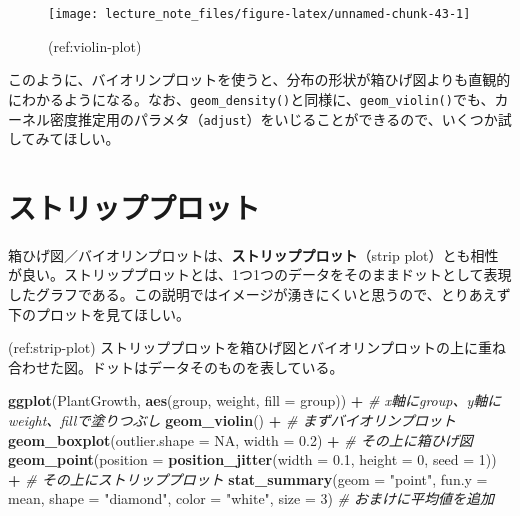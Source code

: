 \documentclass[]{book}
\newenvironment{Shaded}{\begin{snugshade}}{\end{snugshade}}
\newcommand{\KeywordTok}[1]{\textcolor[rgb]{0.13,0.29,0.53}{\textbf{#1}}}
\newcommand{\DataTypeTok}[1]{\textcolor[rgb]{0.13,0.29,0.53}{#1}}
\newcommand{\DecValTok}[1]{\textcolor[rgb]{0.00,0.00,0.81}{#1}}
\newcommand{\FloatTok}[1]{\textcolor[rgb]{0.00,0.00,0.81}{#1}}
\newcommand{\StringTok}[1]{\textcolor[rgb]{0.31,0.60,0.02}{#1}}
\newcommand{\CommentTok}[1]{\textcolor[rgb]{0.56,0.35,0.01}{\textit{#1}}}
\newcommand{\OtherTok}[1]{\textcolor[rgb]{0.56,0.35,0.01}{#1}}
\newcommand{\OperatorTok}[1]{\textcolor[rgb]{0.81,0.36,0.00}{\textbf{#1}}}
\newcommand{\NormalTok}[1]{#1}
\begin{document}
\begin{figure}

{\centering \texttt{[image: lecture\_note\_files/figure-latex/unnamed-chunk-43-1]} 

}

\caption{(ref:violin-plot)}\label{fig:unnamed-chunk-43}
\end{figure}

このように、バイオリンプロットを使うと、分布の形状が箱ひげ図よりも直観的にわかるようになる。なお、\texttt{geom\_density()}と同様に、\texttt{geom\_violin()}でも、カーネル密度推定用のパラメタ（\texttt{adjust}）をいじることができるので、いくつか試してみてほしい。

\section{ストリッププロット}

箱ひげ図／バイオリンプロットは、\textbf{ストリッププロット}（strip
plot）とも相性が良い。ストリッププロットとは、1つ1つのデータをそのままドットとして表現したグラフである。この説明ではイメージが湧きにくいと思うので、とりあえず下のプロットを見てほしい。

(ref:strip-plot)
ストリッププロットを箱ひげ図とバイオリンプロットの上に重ね合わせた図。ドットはデータそのものを表している。

\begin{Shaded}
\begin{Highlighting}[]
\KeywordTok{ggplot}\NormalTok{(PlantGrowth, }\KeywordTok{aes}\NormalTok{(group, weight, }\DataTypeTok{fill =}\NormalTok{ group)) }\OperatorTok{+}\StringTok{ }\CommentTok{# x軸にgroup、y軸にweight、fillで塗りつぶし}
\StringTok{  }\KeywordTok{geom_violin}\NormalTok{() }\OperatorTok{+}\StringTok{ }\CommentTok{# まずバイオリンプロット}
\StringTok{  }\KeywordTok{geom_boxplot}\NormalTok{(}\DataTypeTok{outlier.shape =} \OtherTok{NA}\NormalTok{, }\DataTypeTok{width =} \FloatTok{0.2}\NormalTok{) }\OperatorTok{+}\StringTok{ }\CommentTok{# その上に箱ひげ図}
\StringTok{  }\KeywordTok{geom_point}\NormalTok{(}\DataTypeTok{position =} \KeywordTok{position_jitter}\NormalTok{(}\DataTypeTok{width =} \FloatTok{0.1}\NormalTok{, }\DataTypeTok{height =} \DecValTok{0}\NormalTok{, }\DataTypeTok{seed =} \DecValTok{1}\NormalTok{)) }\OperatorTok{+}\StringTok{ }\CommentTok{# その上にストリッププロット}
\StringTok{  }\KeywordTok{stat_summary}\NormalTok{(}\DataTypeTok{geom =} \StringTok{"point"}\NormalTok{, }\DataTypeTok{fun.y =}\NormalTok{ mean, }\DataTypeTok{shape =} \StringTok{"diamond"}\NormalTok{, }\DataTypeTok{color =} \StringTok{"white"}\NormalTok{, }\DataTypeTok{size =} \DecValTok{3}\NormalTok{) }\CommentTok{# おまけに平均値を追加}
\end{Highlighting}
\end{Shaded}
\end{document}
